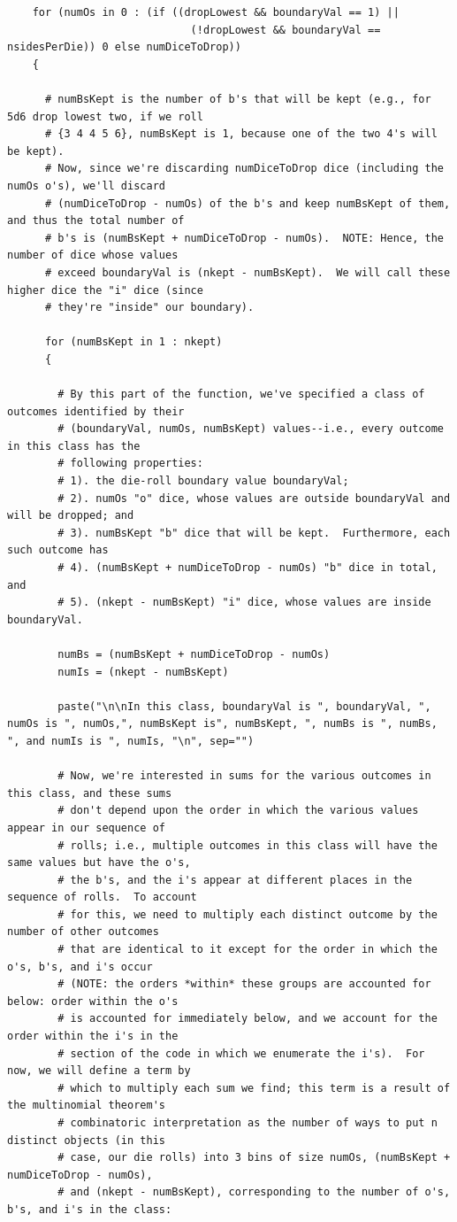 \documentclass[12pt]{article}
\begin{document}
\begin{lstlisting}
    for (numOs in 0 : (if ((dropLowest && boundaryVal == 1) ||
                             (!dropLowest && boundaryVal == nsidesPerDie)) 0 else numDiceToDrop))
    {
      
      # numBsKept is the number of b's that will be kept (e.g., for 5d6 drop lowest two, if we roll
      # {3 4 4 5 6}, numBsKept is 1, because one of the two 4's will be kept).
      # Now, since we're discarding numDiceToDrop dice (including the numOs o's), we'll discard 
      # (numDiceToDrop - numOs) of the b's and keep numBsKept of them, and thus the total number of
      # b's is (numBsKept + numDiceToDrop - numOs).  NOTE: Hence, the number of dice whose values
      # exceed boundaryVal is (nkept - numBsKept).  We will call these higher dice the "i" dice (since
      # they're "inside" our boundary).
      
      for (numBsKept in 1 : nkept)
      {
        
        # By this part of the function, we've specified a class of outcomes identified by their 
        # (boundaryVal, numOs, numBsKept) values--i.e., every outcome in this class has the
        # following properties:
        # 1). the die-roll boundary value boundaryVal; 
        # 2). numOs "o" dice, whose values are outside boundaryVal and will be dropped; and
        # 3). numBsKept "b" dice that will be kept.  Furthermore, each such outcome has
        # 4). (numBsKept + numDiceToDrop - numOs) "b" dice in total, and 
        # 5). (nkept - numBsKept) "i" dice, whose values are inside boundaryVal.
        
        numBs = (numBsKept + numDiceToDrop - numOs)
        numIs = (nkept - numBsKept)
        
        paste("\n\nIn this class, boundaryVal is ", boundaryVal, ", numOs is ", numOs,", numBsKept is", numBsKept, ", numBs is ", numBs, ", and numIs is ", numIs, "\n", sep="")
        
        # Now, we're interested in sums for the various outcomes in this class, and these sums
        # don't depend upon the order in which the various values appear in our sequence of
        # rolls; i.e., multiple outcomes in this class will have the same values but have the o's,
        # the b's, and the i's appear at different places in the sequence of rolls.  To account
        # for this, we need to multiply each distinct outcome by the number of other outcomes
        # that are identical to it except for the order in which the o's, b's, and i's occur
        # (NOTE: the orders *within* these groups are accounted for below: order within the o's 
        # is accounted for immediately below, and we account for the order within the i's in the
        # section of the code in which we enumerate the i's).  For now, we will define a term by
        # which to multiply each sum we find; this term is a result of the multinomial theorem's 
        # combinatoric interpretation as the number of ways to put n distinct objects (in this 
        # case, our die rolls) into 3 bins of size numOs, (numBsKept + numDiceToDrop - numOs), 
        # and (nkept - numBsKept), corresponding to the number of o's, b's, and i's in the class:
        

\end{lstlisting}
\end{document}
